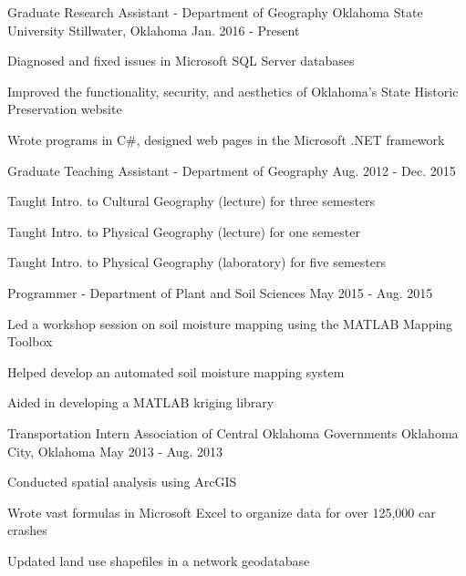 \begin{cventries}
  \cventry
    {Graduate Research Assistant - Department of Geography}
    {Oklahoma State University}
    {Stillwater, Oklahoma}
    {Jan. 2016 - Present}
    {
      \begin{cvitems}
        \item {Diagnosed and fixed issues in Microsoft SQL Server databases}
        \item {Improved the functionality, security, and aesthetics of Oklahoma's State Historic Preservation website}
        \item {Wrote programs in C\#, designed web pages in the Microsoft .NET framework}
      \end{cvitems}
    }

  \cventry
    {Graduate Teaching Assistant - Department of Geography}
    {}
    {}
    {Aug. 2012 - Dec. 2015}
    {
      \begin{cvitems}
        \item {Taught Intro. to Cultural Geography (lecture) for three semesters}
        \item {Taught Intro. to Physical Geography (lecture) for one semester}
        \item {Taught Intro. to Physical Geography (laboratory) for five semesters}
      \end{cvitems}
    }

  \cventry
    {Programmer - Department of Plant and Soil Sciences}
    {}
    {}
    {May 2015 - Aug. 2015}
    {
      \begin{cvitems}
        \item {Led a workshop session on soil moisture mapping using the MATLAB Mapping Toolbox}
        \item {Helped develop an automated soil moisture mapping system}
        \item {Aided in developing a MATLAB kriging library}
      \end{cvitems}
    }

  \cventry
    {Transportation Intern}
    {Association of Central Oklahoma Governments}
    {Oklahoma City, Oklahoma}
    {May 2013 - Aug. 2013}
    {
      \begin{cvitems}
        \item {Conducted spatial analysis using ArcGIS}
        \item {Wrote vast formulas in Microsoft Excel to organize data for over 125,000 car crashes}
        \item {Updated land use shapefiles in a network geodatabase}
      \end{cvitems}
    }


\end{cventries}
